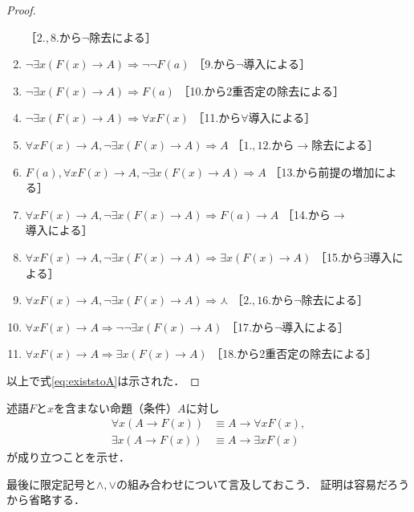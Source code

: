 \begin{proof}
\begin{enumerate}[1. ]
              \quad ［$2., 8.$から$\lnot$除去による］
       \item $\lnot \exists x (F(x) \to A) \Longrightarrow \lnot \lnot F(a)$
              \quad ［9.から$\lnot$導入による］
       \item $\lnot \exists x (F(x) \to A) \Longrightarrow F(a)$ 
              \quad ［10.から2重否定の除去による］
       \item $\lnot \exists x (F(x) \to A) \Longrightarrow \forall x F(x) $
              \quad ［11.から$\forall$導入による］
       \item $\forall x F(x) \to A ,  \lnot \exists x (F(x) \to A) \Longrightarrow A$
              \quad ［$1., 12.$から$\to$除去による］
       \item $F(a) ,  \forall x F(x) \to A ,  \lnot \exists x (F(x) \to A)
              \Longrightarrow A $ \quad ［13.から前提の増加による］
       \item $\forall x F(x) \to A ,  \lnot \exists x(F(x) \to A)
              \Longrightarrow F(a) \to A$ \quad ［14.から$\to$導入による］
       \item $\forall x F(x) \to A ,  \lnot \exists x(F(x) \to A)
              \Longrightarrow \exists x(F(x) \to A)$ \quad ［15.から$\exists$導入による］
       \item $\forall x F(x) \to A ,  \lnot \exists x (F(x) \to A)
              \Longrightarrow \curlywedge$ \quad ［$2., 16.$から$\lnot$除去による］
       \item $\forall x F(x) \to A \Longrightarrow \lnot \lnot \exists x (F(x) \to A)$
              \quad ［17.から$\lnot$導入による］
       \item $\forall x F(x) \to A \Longrightarrow \exists x (F(x) \to A) $
              \quad ［18.から2重否定の除去による］
     \end{enumerate}
     以上で式\eqref{eq:existstoA}は示された．
   \end{proof}
   \begin{que} \label{que:togentei}
     述語$F$と$x$を含まない命題（条件）$A$に対し
     \begin{align}
       \forall x (A \to F(x) ) & \equiv A \to \forall x F(x) ,
       \label{eq:Atoforall} \\
       \exists x (A \to F(x) ) & \equiv A \to \exists x F(x)
       \label{eq:Atoexists}
     \end{align}
     が成り立つことを示せ．
   \end{que}
   最後に限定記号と$\land,  \lor$の組み合わせについて言及しておこう．
   証明は容易だろうから省略する．
